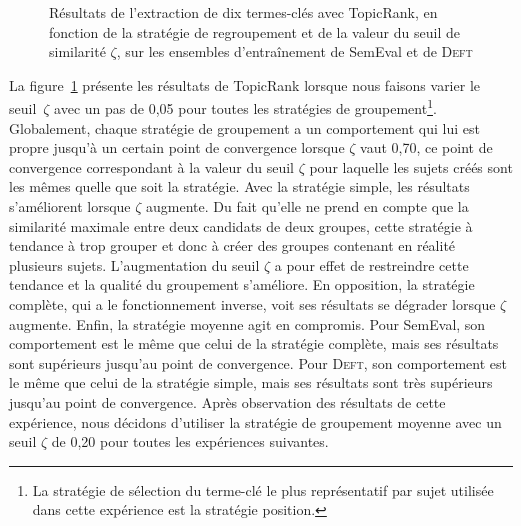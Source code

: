 \begin{figure}
{
          }
          \caption[Résultats de l'extraction de dix termes-clés avec TopicRank,
                   en fonction de la stratégie de regroupement et de la valeur
                   du seuil de similarité $\zeta$]{
            Résultats de l'extraction de dix termes-clés avec TopicRank, en
            fonction de la stratégie de regroupement et de la valeur du seuil
            de similarité $\zeta$, sur les ensembles d'entraînement de
            SemEval et de \textsc{Deft}
            \label{fig:variation_du_seuil_de_similarite}
          }
        \end{figure}

        La figure~\ref{fig:variation_du_seuil_de_similarite} présente les
        résultats de TopicRank lorsque nous faisons varier le seuil~$\zeta$ avec
        un pas de 0,05 pour toutes les stratégies de groupement\footnote{La
        stratégie de sélection du terme-clé le plus représentatif par sujet
        utilisée dans cette expérience est la stratégie position.}.
        Globalement, chaque stratégie de groupement a un comportement qui lui
        est propre jusqu'à un certain point de convergence lorsque $\zeta$ vaut
        0,70, ce point de convergence correspondant à la valeur du seuil $\zeta$
        pour laquelle les sujets créés sont les mêmes quelle que soit la
        stratégie. Avec la stratégie simple, les résultats s'améliorent lorsque
        $\zeta$ augmente. Du fait qu'elle ne prend en compte que la similarité
        maximale entre deux candidats de deux groupes, cette stratégie à
        tendance à trop grouper et donc à créer des groupes contenant en réalité
        plusieurs sujets. L'augmentation du seuil $\zeta$ a pour effet de
        restreindre cette tendance et la qualité du groupement s'améliore. En
        opposition, la stratégie complète, qui a le fonctionnement inverse, voit
        ses résultats se dégrader lorsque $\zeta$ augmente. Enfin, la stratégie
        moyenne agit en compromis. Pour SemEval, son comportement est le même
        que celui de la stratégie complète, mais ses résultats sont supérieurs
        jusqu'au point de convergence. Pour \textsc{Deft}, son comportement est
        le même que celui de la stratégie simple, mais ses résultats sont très
        supérieurs jusqu'au point de convergence.
        Après observation des résultats de cette expérience, nous décidons
        d'utiliser la stratégie de groupement moyenne avec un seuil $\zeta$ de
        0,20 pour toutes les expériences suivantes.

